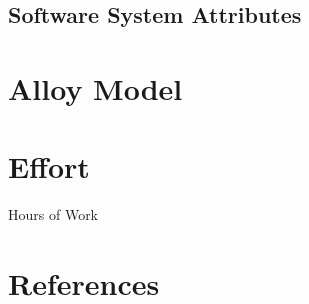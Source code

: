 \documentclass[12pt, a4paper]{report}
\begin{document}
\section{Software System Attributes}


\chapter{Alloy Model}
\label{ch:alloy}



\chapter{Effort}
\label{ch:effort}

Hours of Work


\chapter{References}
\label{ch:referencs}



%

%
\end{document}
